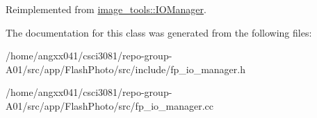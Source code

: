 Reimplemented from \hyperlink{classimage__tools_1_1IOManager_a5038100a2a640a3343c4715101eec120}{image\+\_\+tools\+::\+I\+O\+Manager}.



The documentation for this class was generated from the following files\+:\begin{DoxyCompactItemize}
\item 
/home/angxx041/csci3081/repo-\/group-\/\+A01/src/app/\+Flash\+Photo/src/include/fp\+\_\+io\+\_\+manager.\+h\item 
/home/angxx041/csci3081/repo-\/group-\/\+A01/src/app/\+Flash\+Photo/src/fp\+\_\+io\+\_\+manager.\+cc\end{DoxyCompactItemize}
